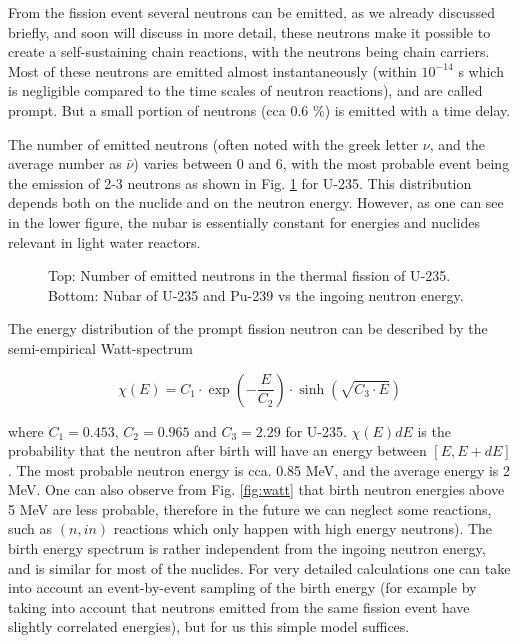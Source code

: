From the fission event several neutrons can be emitted, as we already discussed briefly, and soon will discuss in more detail, these neutrons make it possible to create a self-sustaining chain reactions, with the neutrons being chain carriers. Most of these neutrons are emitted almost instantaneously (within $10^{-14}$ s which is negligible compared to the time scales of neutron reactions), and are called prompt. But a small portion of neutrons (cca 0.6 \%) is emitted with a time delay.

The number of emitted neutrons (often noted with the greek letter $\nu$, and the average number as $\bar\nu$) varies between 0 and 6, with the most probable event being the emission of 2-3 neutrons as shown in Fig. \ref{fig:nu} for U-235. This distribution depends both on the nuclide and on the neutron energy. However, as one can see in the lower figure, the nubar is essentially constant for energies and nuclides relevant in light water reactors.

\begin{figure}[ht!]
\protect {}\protect
\caption{\label{fig:nu} \footnotesize{Top: Number of emitted neutrons in the thermal fission of U-235. Bottom: Nubar of U-235 and Pu-239 vs the ingoing neutron energy.}}
\end{figure}

The energy distribution of the prompt fission neutron can be described by the semi-empirical Watt-spectrum 

\begin{equation}
\chi(E)=C_1\cdot \exp(-\frac{E}{C_2})\cdot \sinh(\sqrt{C_3\cdot E})
\end{equation}

\noindent where   $C_1 = 0.453$, $C_2 = 0.965$ and $C_3 = 2.29$ for U-235. $\chi(E)dE$ is the probability that the neutron after birth will have an energy between $[E,E+dE]$. The most probable neutron energy is cca. 0.85 MeV, and the average energy is 2 MeV. One can also observe from Fig. \ref{fig:watt} that birth neutron energies above 5 MeV are less probable, therefore in the future we can neglect some reactions, such as $(n,\textit{i}n)$ reactions which only happen with high energy neutrons). The birth energy spectrum is rather independent from the ingoing neutron energy, and is similar for most of the nuclides. For very detailed calculations one can take into account an event-by-event sampling of the birth energy (for example by taking into account that neutrons emitted from the same fission event have slightly correlated energies), but for us this simple model suffices. 

